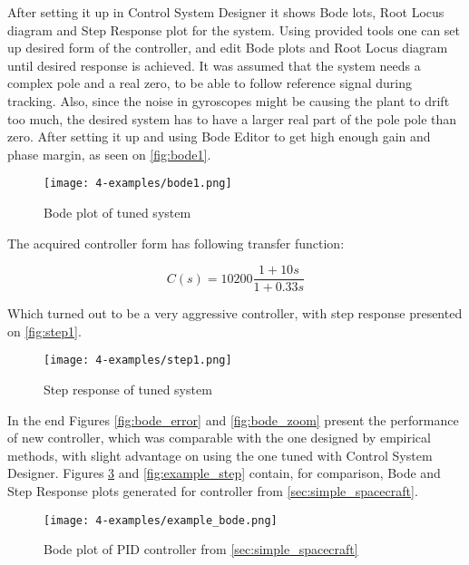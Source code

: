         After setting it up in Control System Designer it shows Bode lots, Root Locus diagram and Step Response plot for the system. Using provided tools one can set up desired form of the controller, and edit Bode plots and Root Locus diagram until desired response is achieved. It was assumed that the system needs a complex pole and a real zero, to be able to follow reference signal during tracking. Also, since the noise in gyroscopes might be causing the plant to drift too much, the desired system has to have a larger real part of the pole pole than zero. After setting it up and using Bode Editor to get high enough gain and phase margin, as seen on \autoref{fig:bode1}.

        \begin{figure}[H]
            \centering
            \texttt{[image: 4-examples/bode1.png]}
            \caption{Bode plot of tuned system}
            \label{fig:bode1}
        \end{figure}

        The acquired controller form has following transfer function:
        
        \begin{equation}
            C(s)=10200\frac{1+10s}{1+0.33s}
        \end{equation}

        Which turned out to be a very aggressive controller, with step response presented on \autoref{fig:step1}.

        \begin{figure}[H]
            \centering
            \texttt{[image: 4-examples/step1.png]}
            \caption{Step response of tuned system}
            \label{fig:step1}
        \end{figure}
        
        In the end Figures \ref{fig:bode_error} and \ref{fig:bode_zoom} present the performance of new controller, which was comparable with the one designed by empirical methods, with slight advantage on using the one tuned with Control System Designer. Figures \ref{fig:example_bode} and \ref{fig:example_step} contain, for comparison, Bode and Step Response plots generated for controller from \autoref{sec:simple_spacecraft}.

        \begin{figure}[H]
            \centering
            \texttt{[image: 4-examples/example\_bode.png]}
            \caption{Bode plot of PID controller from \autoref{sec:simple_spacecraft}}
            \label{fig:example_bode}
        \end{figure}

